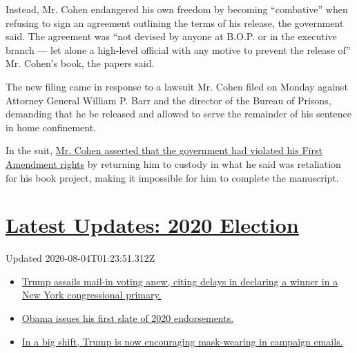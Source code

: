 Instead, Mr. Cohen endangered his own freedom by becoming ``combative''
when refusing to sign an agreement outlining the terms of his release,
the government said. The agreement was ``not devised by anyone at B.O.P.
or in the executive branch --- let alone a high-level official with any
motive to prevent the release of'' Mr. Cohen's book, the papers said.

The new filing came in response to a lawsuit Mr. Cohen filed on Monday
against Attorney General William P. Barr and the director of the Bureau
of Prisons, demanding that he be released and allowed to serve the
remainder of his sentence in home confinement.

In the suit,
\href{https://www.nytimes.com/2020/07/21/nyregion/michael-cohen-trump-book.html}{Mr.
Cohen asserted that the government had violated his First Amendment
rights} by returning him to custody in what he said was retaliation for
his book project, making it impossible for him to complete the
manuscript.

\hypertarget{latest-updates-2020-election}{%
\section{\texorpdfstring{\href{https://www.nytimes.com/2020/08/03/us/elections/biden-vs-trump.html?action=click\&pgtype=Article\&state=default\&region=MAIN_CONTENT_1\&context=storylines_live_updates}{Latest
Updates: 2020
Election}}{Latest Updates: 2020 Election}}\label{latest-updates-2020-election}}

Updated 2020-08-04T01:23:51.312Z

\begin{itemize}
\tightlist
\item
  \href{https://www.nytimes.com/2020/08/03/us/elections/biden-vs-trump.html?action=click\&pgtype=Article\&state=default\&region=MAIN_CONTENT_1\&context=storylines_live_updates\#link-6494b448}{Trump
  assails mail-in voting anew, citing delays in declaring a winner in a
  New York congressional primary.}
\item
  \href{https://www.nytimes.com/2020/08/03/us/elections/biden-vs-trump.html?action=click\&pgtype=Article\&state=default\&region=MAIN_CONTENT_1\&context=storylines_live_updates\#link-3de249e6}{Obama
  issues his first slate of 2020 endorsements.}
\item
  \href{https://www.nytimes.com/2020/08/03/us/elections/biden-vs-trump.html?action=click\&pgtype=Article\&state=default\&region=MAIN_CONTENT_1\&context=storylines_live_updates\#link-54e34d20}{In
  a big shift, Trump is now encouraging mask-wearing in campaign
  emails.}
\end{itemize}

